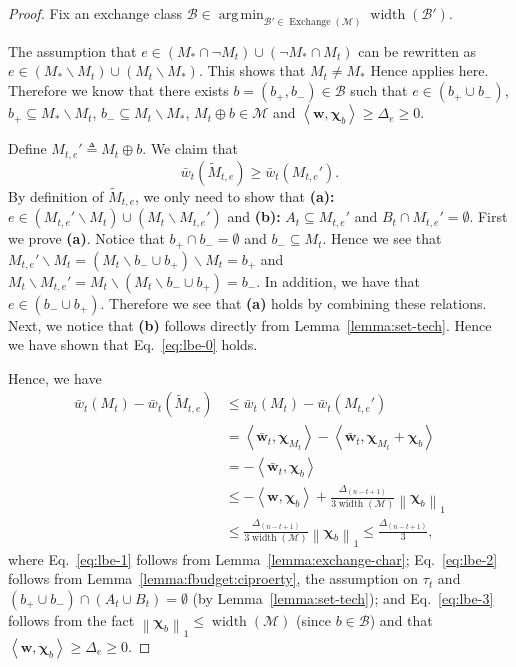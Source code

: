 \documentclass{article}
\newcommand{\M}{\mathcal M}
\newcommand{\B}{\mathcal B}
\newcommand{\del}{\backslash}
\DeclareMathOperator{\rank}{width}
\DeclareMathOperator*{\argmin}{arg\,min}
\DeclareMathOperator{\Exchange}{Exchange}
\newcommand{\inn}[1]{\left\langle #1 \right\rangle}
\newcommand{\nor}[1]{\left\|#1\right\|}
\renewcommand{\vec}[1]{\boldsymbol{#1}}
\begin{document}
\begin{proof}
Fix an exchange class $\B\in \argmin_{\B'\in \Exchange(\M)} \rank(\B')$.

The assumption that $e\in (M_*\cap \neg M_t) \cup (\neg M_* \cap M_t)$ can be rewritten as 
$e \in (M_* \del M_t) \cup (M_t\del M_*)$.
This shows that $M_t\not=M_*$
Hence  applies here. 
Therefore we know that there exists $b=(b_+,b_-)\in \B$ such that
$e\in (b_+\cup b_-)$, $b_+\subseteq M_* \del M_t$, $b_- \subseteq M_t \del M_*$, $M_t \oplus b \in \M$ and $\inn{\vec w,\vec\chi_b}\ge \Delta_e \ge 0$.

Define $M_{t,e}' \triangleq M_t \oplus b$.
We claim that
\begin{equation}
\label{eq:lbe-0}
\bar w_t(\tilde M_{t,e}) \ge \bar w_t(M_{t,e}').
\end{equation}
By definition of $\tilde M_{t,e}$, we only need to show that \textbf{(a):} $e\in (M_{t,e}' \del M_t) \cup (M_t \del M_{t,e}')$ and \textbf{(b):} $A_t \subseteq M_{t,e}'$ and $B_t \cap M_{t,e}' = \emptyset$.
First we prove \textbf{(a)}. Notice that $b_+\cap b_- = \emptyset$ and $b_- \subseteq M_t$. 
Hence we see that $M_{t,e}' \del M_t = (M_t\del b_-\cup b_+) \del M_t = b_+$ and
$M_t \del M_{t,e}' = M_t \del (M_t \del b_-\cup b_+) = b_-$. 
In addition, we have that $e\in (b_-\cup b_+)$. Therefore we see that \textbf{(a)} holds by combining these relations. 
Next, we notice that \textbf{(b)} follows directly from Lemma~\ref{lemma:set-tech}.
Hence we have shown that Eq.~\eqref{eq:lbe-0} holds.

Hence, we have
\begin{align}
	\bar w_t(M_t)-\bar w_t(\tilde M_{t,e}) 
	&\le \bar w_t(M_t)-\bar w_t(M_{t,e}') \nonumber\\
	&= \inn{\vec{\bar w}_t, \vec \chi_{M_t}}-\inn{\vec{\bar w}_t, \vec \chi_{M_t}+\vec\chi_b} \label{eq:lbe-1} \\
	&= -\inn{\vec{\bar w}_t, \vec\chi_b} \nonumber\\
	&\le -\inn{\vec w, \vec\chi_b}+ \frac{\Delta_{(n-t+1)}}{3\rank(\M)}\nor{\vec\chi_b}_1 \label{eq:lbe-2}\\
	&\le \frac{\Delta_{(n-t+1)}}{3\rank(\M)}\nor{\vec\chi_b}_1 \le \frac{\Delta_{(n-t+1)}}{3}, \label{eq:lbe-3}
\end{align}
where Eq.~\eqref{eq:lbe-1} follows from Lemma~\ref{lemma:exchange-char};
Eq.~\eqref{eq:lbe-2} follows from Lemma~\ref{lemma:fbudget:ciproerty}, the assumption on $\tau_t$ and $(b_+\cup b_-) \cap (A_t \cup B_t) = \emptyset$ (by Lemma~\ref{lemma:set-tech});
and Eq.~\eqref{eq:lbe-3} follows from the fact $\nor{\vec\chi_b}_1 \le \rank(\M)$ (since $b\in \B$) and that $\inn{\vec w, \vec\chi_b} \ge \Delta_e \ge 0$.
\end{proof}
\end{document}
